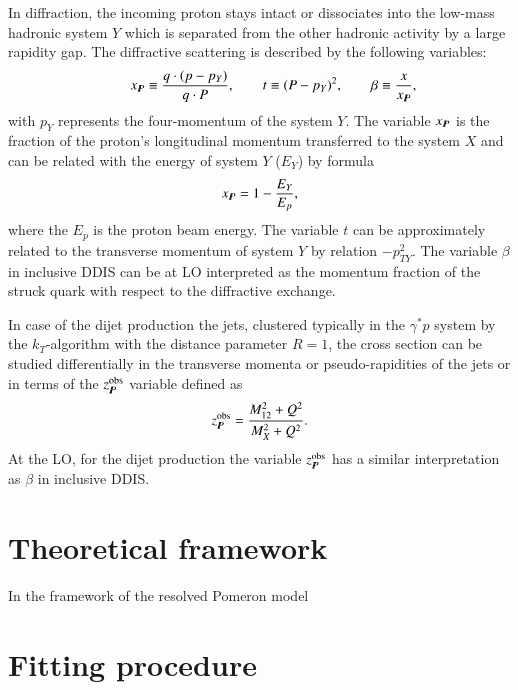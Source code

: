 \documentclass[12pt]{article}
\begin{document}
In diffraction, the incoming proton stays intact or dissociates into the low-mass hadronic system $Y$ which is separated from the other hadronic activity by a large rapidity gap.
The diffractive scattering is described by the following variables:
\begin{equation}
\qquad x_{I\!\!P} \equiv \frac{q \cdot (p - p_Y)}{q\cdot P},\qquad   t \equiv (P - p_Y)^2,       \qquad \beta \equiv \frac{x}{x_{I\!\!P}},
\end{equation}
with $p_Y$ represents the four-momentum of the system $Y$.
The variable $x_{I\!\!P}$ is the fraction of the proton's longitudinal momentum transferred to the system $X$ and can be related with the energy of system $Y$ ($E_Y$) by formula
\begin{equation}
x_{I\!\!P} = 1 - \frac{E_Y}{E_p},
\end{equation}
where the $E_p$ is the proton beam energy.
The variable $t$ can be approximately related to the transverse momentum of system $Y$ by relation $- p_{TY}^2$.
The variable $\beta$ in inclusive DDIS can be at LO interpreted as the  momentum fraction of the struck quark with respect to the diffractive exchange.

In case of the dijet production the jets, clustered typically in the $\gamma^{*}p$ system by the $k_T$-algorithm with the distance parameter $R = 1$, the cross section can be studied differentially in the transverse momenta or pseudo-rapidities of the jets or in terms of the $z_{I\!\!P}^\mathrm{obs}$ variable defined as
\begin{equation}
z_{I\!\!P}^\mathrm{obs} = \frac{M_{12}^2 + Q^2}{M_X^2 + Q^2}.
\end{equation}
At the LO, for the dijet production the variable $z_{I\!\!P}^\mathrm{obs}$ has a similar interpretation as $\beta$ in inclusive DDIS.


\section{Theoretical framework}
In the framework of the resolved Pomeron model 


\section{Fitting procedure}
\end{document}
